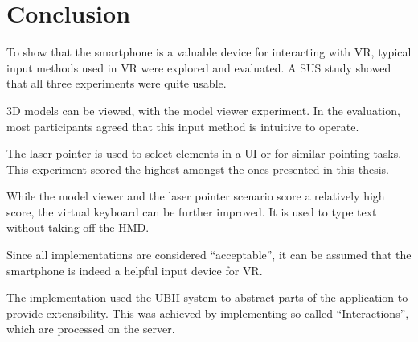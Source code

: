 \chapter{Conclusion}\label{chapter:conclusion}

To show that the smartphone is a valuable device for interacting with \ac{VR}, typical input methods used in \ac{VR} were explored and evaluated. A \ac{SUS} study showed that all three experiments were quite usable. 

\ac{3D} models can be viewed, with the model viewer experiment. In the evaluation, most participants agreed that this input method is intuitive to operate.

The laser pointer is used to select elements in a \ac{UI} or for similar pointing tasks. This experiment scored the highest amongst the ones presented in this thesis. 

While the model viewer and the laser pointer scenario score a relatively high score, the virtual keyboard can be further improved. It is used to type text without taking off the \ac{HMD}.

Since all implementations are considered \enquote{acceptable}, it can be assumed that the smartphone is indeed a helpful input device for \ac{VR}.

The implementation used the \ac{UBII} system to abstract parts of the application to provide extensibility. This was achieved by implementing so-called \enquote{Interactions}, which are processed on the server. 